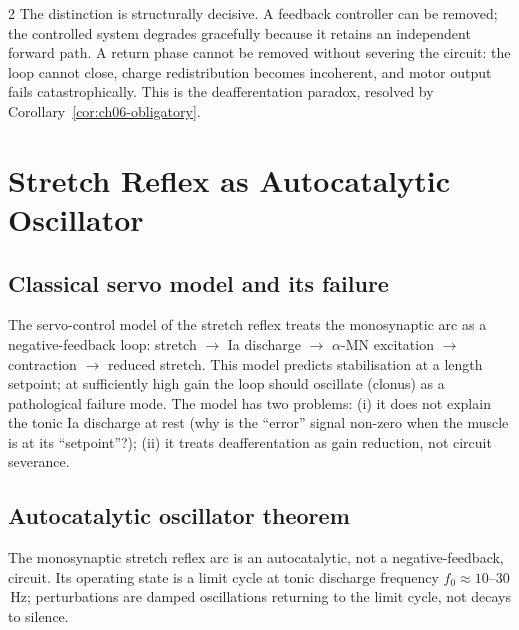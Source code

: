 \begin{multicols}{2}
The distinction is structurally decisive.  A feedback controller can be
removed; the controlled system degrades gracefully because it retains an
independent forward path.  A return phase cannot be removed without severing
the circuit: the loop cannot close, charge redistribution becomes incoherent,
and motor output fails catastrophically.  This is the deafferentation paradox,
resolved by Corollary~\ref{cor:ch06-obligatory}.

\section{Stretch Reflex as Autocatalytic Oscillator}
\label{sec:ch06-stretchreflex}

\subsection{Classical servo model and its failure}

The servo-control model of the stretch reflex
\citep{merton1953,matthews1990} treats the monosynaptic arc as a
negative-feedback loop: stretch $\to$ Ia discharge $\to$ $\alpha$-MN
excitation $\to$ contraction $\to$ reduced stretch.  This model predicts
stabilisation at a length setpoint; at sufficiently high gain the loop
should oscillate (clonus) as a pathological failure mode.  The model has
two problems: (i) it does not explain the tonic Ia discharge at rest (why
is the ``error'' signal non-zero when the muscle is at its ``setpoint''?);
(ii) it treats deafferentation as gain reduction, not circuit severance.

\subsection{Autocatalytic oscillator theorem}

\begin{theorem}
\label{thm:ch06-autocatalytic}
The monosynaptic stretch reflex arc is an autocatalytic, not a
negative-feedback, circuit.  Its operating state is a limit cycle at
tonic discharge frequency $f_0 \approx 10$--$30$\,Hz; perturbations are
damped oscillations returning to the limit cycle, not decays to silence.
\end{theorem}


\end{multicols}
